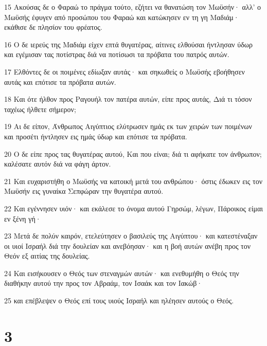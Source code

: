 \par 15 Ακούσας δε ο Φαραώ το πράγμα τούτο, εζήτει να θανατώση τον Μωϋσήν· αλλ' ο Μωϋσής έφυγεν από προσώπου του Φαραώ και κατώκησεν εν τη γη Μαδιάμ· εκάθισε δε πλησίον του φρέατος.
\par 16 Ο δε ιερεύς της Μαδιάμ είχεν επτά θυγατέρας, αίτινες ελθούσαι ήντλησαν ύδωρ και εγέμισαν τας ποτίστρας διά να ποτίσωσι τα πρόβατα του πατρός αυτών.
\par 17 Ελθόντες δε οι ποιμένες εδίωξαν αυτάς· και σηκωθείς ο Μωϋσής εβοήθησεν αυτάς και επότισε τα πρόβατα αυτών.
\par 18 Και ότε ήλθον προς Ραγουήλ τον πατέρα αυτών, είπε προς αυτάς, Διά τι τόσον ταχέως ήλθετε σήμερον;
\par 19 Αι δε είπον, Άνθρωπος Αιγύπτιος ελύτρωσεν ημάς εκ των χειρών των ποιμένων και προσέτι ήντλησεν εις ημάς ύδωρ και επότισε τα πρόβατα.
\par 20 Ο δε είπε προς τας θυγατέρας αυτού, Και που είναι; διά τι αφήκατε τον άνθρωπον; καλέσατε αυτόν διά να φάγη άρτον.
\par 21 Και ευχαριστήθη ο Μωϋσής να κατοική μετά του ανθρώπου· όστις έδωκεν εις τον Μωϋσήν εις γυναίκα Σεπφώραν την θυγατέρα αυτού.
\par 22 Και εγέννησεν υιόν· και εκάλεσε το όνομα αυτού Γηρσώμ, λέγων, Πάροικος είμαι εν ξένη γή·
\par 23 Μετά δε πολύν καιρόν, ετελεύτησεν ο βασιλεύς της Αιγύπτου· και κατεστέναξαν οι υιοί Ισραήλ διά την δουλείαν και ανεβόησαν· και η βοή αυτών ανέβη προς τον Θεόν εξ αιτίας της δουλείας.
\par 24 Και εισήκουσεν ο Θεός των στεναγμών αυτών· και ενεθυμήθη ο Θεός την διαθήκην αυτού την προς τον Αβραάμ, τον Ισαάκ και τον Ιακώβ·
\par 25 και επέβλεψεν ο Θεός επί τους υιούς Ισραήλ και ηλέησεν αυτούς ο Θεός.

\chapter{3}

